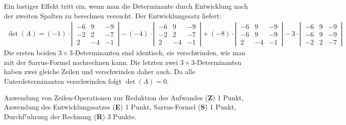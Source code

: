 \begin{loesung}
Ein lustiger Effekt tritt ein, wenn man die Determinante durch Entwicklung
nach der zweiten Spalten zu berechnen versucht.
Der Entwicklungssatz liefert:
\begin{align*}
\det(A)
=(-1)\cdot
\left|\,\begin{matrix}
-6& 9&-9\\
-2& 2&-7\\
 2&-4&-1
\end{matrix}\,\right|
-(-4)\cdot
\left|\,\begin{matrix}
-6& 9&-9\\
-2& 2&-7\\
 2&-4&-1
\end{matrix}\,\right|
+(-8)\cdot
\left|\,\begin{matrix}
-6& 9&-9\\
-6& 9&-9\\
 2&-4&-1
\end{matrix}\,\right|
-3\cdot
\left|\,\begin{matrix}
-6& 9&-9\\
-6& 9&-9\\
-2& 2&-7
\end{matrix}\,\right|
\end{align*}
Die ersten beiden $3\times 3$-Determinanten sind identisch, sie verschwinden,
wie man mit der Sarrus-Formel nachrechnen kann.
Die letzten zwei $3\times 3$-Determinanten haben zwei gleiche Zeilen und
verschwinden daher auch.
Da alle Unterdeterminanten verschwinden folgt $\det(A)=0$.
\end{loesung}

\begin{bewertung}
Anwendung von Zeilen-Operationen zur Reduktion des Aufwandes
({\bf Z}) 1 Punkt, Anwendung des Entwicklungssatzes ({\bf E}) 1 Punkt,
Sarrus-Formel ({\bf S}) 1 Punkt, Durchf"uhrung der Rechnung ({\bf R})
3 Punkte.
\end{bewertung}

